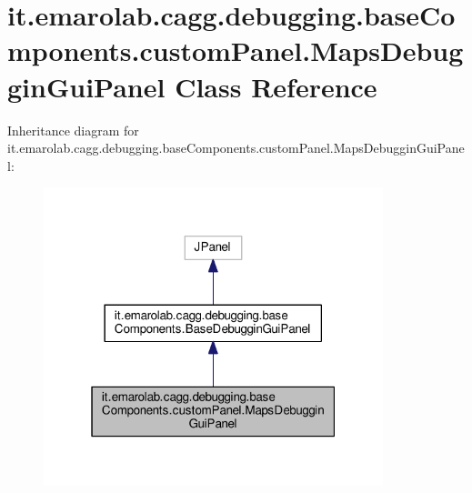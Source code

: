 \hypertarget{classit_1_1emarolab_1_1cagg_1_1debugging_1_1baseComponents_1_1customPanel_1_1MapsDebugginGuiPanel}{\section{it.\-emarolab.\-cagg.\-debugging.\-base\-Components.\-custom\-Panel.\-Maps\-Debuggin\-Gui\-Panel Class Reference}
\label{classit_1_1emarolab_1_1cagg_1_1debugging_1_1baseComponents_1_1customPanel_1_1MapsDebugginGuiPanel}
}


Inheritance diagram for it.\-emarolab.\-cagg.\-debugging.\-base\-Components.\-custom\-Panel.\-Maps\-Debuggin\-Gui\-Panel\-:\nopagebreak
\begin{figure}[H]
\begin{center}
\leavevmode
\includegraphics[width=280pt]{classit_1_1emarolab_1_1cagg_1_1debugging_1_1baseComponents_1_1customPanel_1_1MapsDebugginGuiPanel__inherit__graph}
\end{center}
\end{figure}


